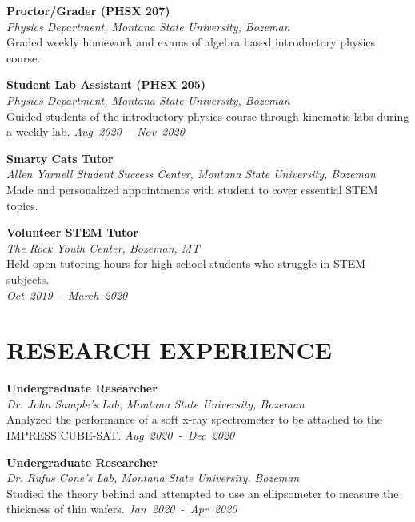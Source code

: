 \documentclass[margin]{res}
\begin{document}
\begin{resume}
\noindent
\raggedright
\textbf{Proctor/Grader (PHSX 207)}\\
{\sl Physics Department, Montana State University, Bozeman}\\\vspace{0.5ex}
Graded weekly homework and exams of algebra based introductory physics course.\\

\noindent
\raggedright
\textbf{Student Lab Assistant (PHSX 205)}\\
{\sl Physics Department, Montana State University, Bozeman}\\\vspace{0.5ex}
Guided students of the introductory physics course through kinematic labs during a weekly lab. \hfill
{\sl Aug~2020~-~Nov~2020}

\noindent
\raggedright
\textbf{Smarty Cats Tutor}\\\vspace{0.5ex}
{\sl Allen Yarnell Student Success Center, Montana State University, Bozeman}\\
Made and personalized appointments with student to cover essential STEM topics.\\

\noindent
\raggedright
\textbf{Volunteer STEM Tutor}\\
{\sl The Rock Youth Center, Bozeman, MT}\\\vspace{0.5ex}
Held open tutoring hours for high school students who struggle in STEM subjects.\\
\raggedleft
{\sl Oct~2019~-~March~2020}


\section{RESEARCH EXPERIENCE}
\noindent
\raggedright
\textbf{Undergraduate Researcher}\\
{\sl Dr. John Sample's Lab, Montana State University, Bozeman}\\\vspace{0.5ex}
Analyzed the performance of a soft x-ray spectrometer to be attached to the IMPRESS CUBE-SAT.  \hfill
{\sl Aug~2020~-~Dec~2020}

\noindent
\raggedright
\textbf{Undergraduate Researcher}\\
{\sl Dr. Rufus Cone's Lab, Montana State University, Bozeman}\\\vspace{0.5ex}
Studied the theory behind and attempted to use an ellipsometer to measure the thickness of thin wafers.  \hfill
{\sl Jan~2020~-~Apr~2020}


\end{resume}
\end{document}
